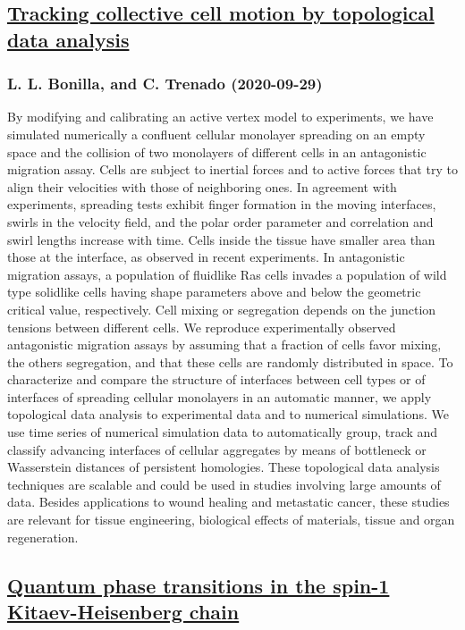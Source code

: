 \subsection*{\href{http://arxiv.org/abs/2009.14161v1}{Tracking collective cell motion by topological data analysis}}
\subsubsection*{L. L. Bonilla, and C. Trenado (2020-09-29)}
By modifying and calibrating an active vertex model to experiments, we have
simulated numerically a confluent cellular monolayer spreading on an empty
space and the collision of two monolayers of different cells in an antagonistic
migration assay. Cells are subject to inertial forces and to active forces that
try to align their velocities with those of neighboring ones. In agreement with
experiments, spreading tests exhibit finger formation in the moving interfaces,
swirls in the velocity field, and the polar order parameter and correlation and
swirl lengths increase with time. Cells inside the tissue have smaller area
than those at the interface, as observed in recent experiments. In antagonistic
migration assays, a population of fluidlike Ras cells invades a population of
wild type solidlike cells having shape parameters above and below the geometric
critical value, respectively. Cell mixing or segregation depends on the
junction tensions between different cells. We reproduce experimentally observed
antagonistic migration assays by assuming that a fraction of cells favor
mixing, the others segregation, and that these cells are randomly distributed
in space. To characterize and compare the structure of interfaces between cell
types or of interfaces of spreading cellular monolayers in an automatic manner,
we apply topological data analysis to experimental data and to numerical
simulations. We use time series of numerical simulation data to automatically
group, track and classify advancing interfaces of cellular aggregates by means
of bottleneck or Wasserstein distances of persistent homologies. These
topological data analysis techniques are scalable and could be used in studies
involving large amounts of data. Besides applications to wound healing and
metastatic cancer, these studies are relevant for tissue engineering,
biological effects of materials, tissue and organ regeneration.

\subsection*{\href{http://arxiv.org/abs/2009.14159v1}{Quantum phase transitions in the spin-1 Kitaev-Heisenberg chain}}
